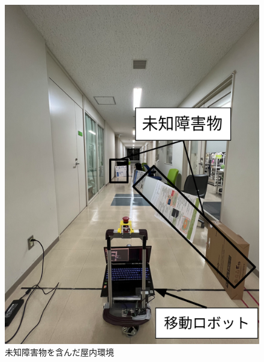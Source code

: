 \begin{figure}[htbp]
  \begin{minipage}[b]{0.5\linewidth}
    \centering
    \includegraphics[keepaspectratio, scale=0.32]{figs/unknown_obstacles.png}
    \caption{未知障害物を含んだ屋内環境}
    \label{fig:unknown-obstacles}
  \end{minipage}
  \begin{minipage}[b]{0.5\linewidth}
    \centering

\end{minipage}
\end{figure}
